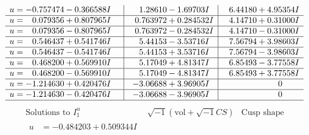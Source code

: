 \documentclass[1p]{elsarticle_modified}
\theoremstyle{definition}
\newcommand{\I}{\sqrt{-1}}
\begin{document}
$$\begin{array}{c|c|c}
\begin{aligned}
u &= -0.757474 - 0.366588 I\end{aligned}
 & \phantom{-}1.28610 - 1.69703 I & \phantom{-}6.44180 + 4.95354 I \\ \hline\begin{aligned}
u &= \phantom{-}0.079356 + 0.807965 I\end{aligned}
 & \phantom{-}0.763972 + 0.284532 I & \phantom{-}4.14710 + 0.31000 I \\ \hline\begin{aligned}
u &= \phantom{-}0.079356 - 0.807965 I\end{aligned}
 & \phantom{-}0.763972 - 0.284532 I & \phantom{-}4.14710 - 0.31000 I \\ \hline\begin{aligned}
u &= \phantom{-}0.546437 + 0.541746 I\end{aligned}
 & \phantom{-}5.44153 - 3.53716 I & \phantom{-}7.56794 + 3.98603 I \\ \hline\begin{aligned}
u &= \phantom{-}0.546437 - 0.541746 I\end{aligned}
 & \phantom{-}5.44153 + 3.53716 I & \phantom{-}7.56794 - 3.98603 I \\ \hline\begin{aligned}
u &= \phantom{-}0.468200 + 0.569910 I\end{aligned}
 & \phantom{-}5.17049 + 4.81347 I & \phantom{-}6.85493 - 3.77558 I \\ \hline\begin{aligned}
u &= \phantom{-}0.468200 - 0.569910 I\end{aligned}
 & \phantom{-}5.17049 - 4.81347 I & \phantom{-}6.85493 + 3.77558 I \\ \hline\begin{aligned}
u &= -1.214630 + 0.420476 I\end{aligned}
 & -3.06688 + 3.96905 I & \phantom{-0.000000 } 0 \\ \hline\begin{aligned}
u &= -1.214630 - 0.420476 I\end{aligned}
 & -3.06688 - 3.96905 I & \phantom{-0.000000 } 0\\
 \hline 
 \end{array}$$\newpage$$\begin{array}{c|c|c}  
\text{Solutions to }I^u_{1}& \I (\text{vol} + \sqrt{-1}CS) & \text{Cusp shape}\\
 \hline 
\begin{aligned}
u &= -0.484203 + 0.509344 I\end{aligned}

\end{array}$$
\end{document}
